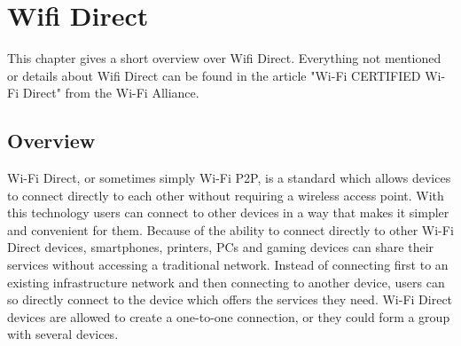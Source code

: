 \chapter{Wifi Direct}
\label{cha:WifiDirect}
This chapter gives a short overview over Wifi Direct. Everything not mentioned or details about Wifi Direct can be found in the article "Wi-Fi CERTIFIED Wi-Fi Direct" from the Wi-Fi Alliance\cite{wifialliance}.

\section{Overview}
\label{sec:Overview}
Wi-Fi Direct, or sometimes simply Wi-Fi P2P, is a standard which allows devices to connect directly to each other without requiring a wireless access point. With this technology users can connect to other devices in a way that makes it simpler and convenient for them. Because of the ability to connect directly to other Wi-Fi Direct devices, smartphones, printers, PCs and gaming devices can share their services without accessing a traditional network. Instead of connecting first to an existing infrastructure network and then connecting to another device, users can so directly connect to the device which offers the services they need. Wi-Fi Direct devices are allowed to create a one-to-one connection, or they could form a group with several devices\cite{wifip2p4}.\newline

